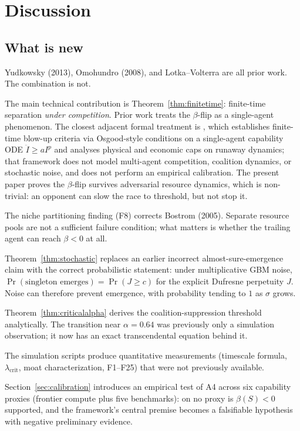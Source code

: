 \documentclass[11pt,letterpaper]{article}
\theoremstyle{plain}
\theoremstyle{definition}
\theoremstyle{remark}
\begin{document}
\section{Discussion}
\label{sec:discussion}

\subsection{What is new}

Yudkowsky (2013), Omohundro (2008), and Lotka--Volterra are all prior work.
The combination is not.

The main technical contribution is Theorem~\ref{thm:finitetime}: finite-time
separation \emph{under competition}.
Prior work treats the $\beta$-flip as a single-agent phenomenon.
The closest adjacent formal treatment is
\citet{anbarjafari2025singularity}, which establishes finite-time blow-up
criteria via Osgood-style conditions on a single-agent capability ODE
$\ddot{I} \geq aI^p$ and analyses physical and economic caps on
runaway dynamics; that framework does not model multi-agent competition,
coalition dynamics, or stochastic noise, and does not perform an
empirical calibration.
The present paper proves the $\beta$-flip survives adversarial resource
dynamics, which is non-trivial: an opponent can slow the race to
threshold, but not stop it.

The niche partitioning finding (F8) corrects Bostrom (2005).
Separate resource pools are not a sufficient failure condition; what matters
is whether the trailing agent can reach $\beta < 0$ at all.

Theorem~\ref{thm:stochastic} replaces an earlier incorrect
almost-sure-emergence claim with the correct probabilistic statement:
under multiplicative GBM noise, $\Pr(\text{singleton emerges}) =
\Pr(J \geq c)$ for the explicit Dufresne perpetuity $J$.
Noise can therefore prevent emergence, with probability tending to $1$
as $\sigma$ grows.

Theorem~\ref{thm:criticalalpha} derives the coalition-suppression threshold
analytically.
The transition near $\alpha = 0.64$ was previously only a simulation
observation; it now has an exact transcendental equation behind it.

The simulation scripts produce quantitative measurements (timescale formula,
$\lambda_{\mathrm{crit}}$, moat characterization, F1--F25) that were not
previously available.

Section~\ref{sec:calibration} introduces an empirical test of A4 across
six capability proxies (frontier compute plus five benchmarks): on no
proxy is $\beta(S) < 0$ supported, and the framework's central premise
becomes a falsifiable hypothesis with negative
preliminary evidence.
\end{document}

